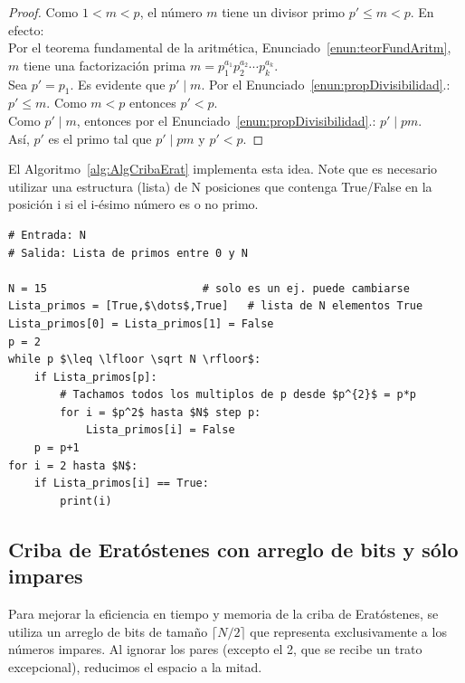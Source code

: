 \begin{proof} Como $1 < m < p$, el número $m$ tiene un divisor primo $p' \leq m < p$. En efecto: \\
Por el teorema fundamental de la aritmética, Enunciado~\ref{enun:teorFundAritm}, $m$ tiene una  factorización prima $m = p_1^{a_1} p_2^{a_2} \cdots p_k^{a_k}$. \\
Sea $p' = p_1$. Es evidente que $p' \mid m$. \setcounter{enumi}{2} Por el Enunciado~\ref{enun:propDivisibilidad}.: $p' \leq m$. Como $m < p$ entonces $p' < p$. \\
Como $p' \mid m$, entonces \setcounter{enumi}{3}
por el Enunciado~\ref{enun:propDivisibilidad}.: $p' \mid pm$. \\
Así, $p'$ es el primo tal que $p' \mid pm$ y $p' < p$.
\end{proof}

\noindent El Algoritmo~\ref{alg:AlgCribaErat} implementa esta idea.
Note que es necesario utilizar una estructura (lista) de N posiciones que contenga True/False en la posición i si el i-ésimo número es o no primo.

\begin{lstlisting}[caption={Criba de Eratóstenes}, label={alg:AlgCribaErat}, mathescape=true]
# Entrada: N
# Salida: Lista de primos entre 0 y N 

N = 15                        # solo es un ej. puede cambiarse
Lista_primos = [True,$\dots$,True]   # lista de N elementos True
Lista_primos[0] = Lista_primos[1] = False  
p = 2
while p $\leq \lfloor \sqrt N \rfloor$:
    if Lista_primos[p]:
        # Tachamos todos los multiplos de p desde $p^{2}$ = p*p
        for i = $p^2$ hasta $N$ step p:
            Lista_primos[i] = False
    p = p+1
for i = 2 hasta $N$:
    if Lista_primos[i] == True:
        print(i)
\end{lstlisting}

\subsection{Criba de Eratóstenes con arreglo de bits y sólo impares}
Para mejorar la eficiencia en tiempo y memoria de la criba de Eratóstenes, se utiliza un arreglo de bits de tamaño $\lceil N/2 \rceil$ que representa exclusivamente a los números impares. Al ignorar los pares (excepto el 2, que se recibe un trato excepcional), reducimos el espacio a la mitad.

